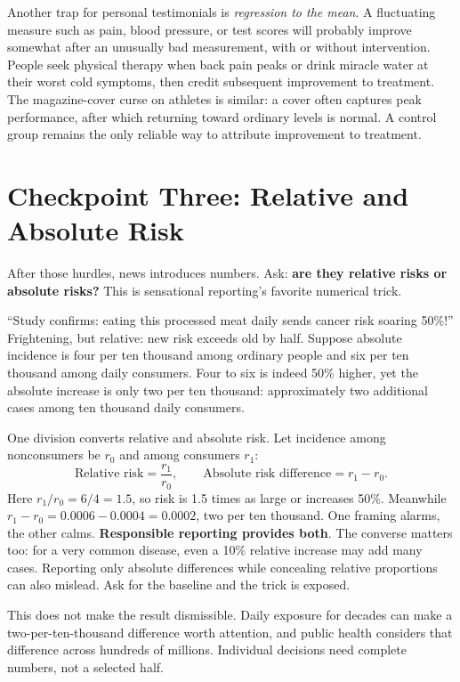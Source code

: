 Another trap for personal testimonials is \emph{regression to the mean}. A fluctuating measure such as pain, blood pressure, or test scores will probably improve somewhat after an unusually bad measurement, with or without intervention. People seek physical therapy when back pain peaks or drink miracle water at their worst cold symptoms, then credit subsequent improvement to treatment. The magazine-cover curse on athletes is similar: a cover often captures peak performance, after which returning toward ordinary levels is normal. A control group remains the only reliable way to attribute improvement to treatment.

\section{Checkpoint Three: Relative and Absolute Risk}

After those hurdles, news introduces numbers. Ask: \textbf{are they relative risks or absolute risks?} This is sensational reporting's favorite numerical trick.

``Study confirms: eating this processed meat daily sends cancer risk soaring 50\%!'' Frightening, but relative: new risk exceeds old by half. Suppose absolute incidence is four per ten thousand among ordinary people and six per ten thousand among daily consumers. Four to six is indeed 50\% higher, yet the absolute increase is only two per ten thousand: approximately two additional cases among ten thousand daily consumers.

\begin{qiaoliang}
One division converts relative and absolute risk. Let incidence among nonconsumers be $r_0$ and among consumers $r_1$:
\[
\text{Relative risk} = \frac{r_1}{r_0}, \qquad \text{Absolute risk difference} = r_1 - r_0 .
\]
Here $r_1/r_0 = 6/4 = 1.5$, so risk is 1.5 times as large or increases 50\%. Meanwhile $r_1 - r_0 = 0.0006 - 0.0004 = 0.0002$, two per ten thousand. One framing alarms, the other calms. \textbf{Responsible reporting provides both}. The converse matters too: for a very common disease, even a 10\% relative increase may add many cases. Reporting only absolute differences while concealing relative proportions can also mislead. Ask for the baseline and the trick is exposed.
\end{qiaoliang}

This does not make the result dismissible. Daily exposure for decades can make a two-per-ten-thousand difference worth attention, and public health considers that difference across hundreds of millions. Individual decisions need complete numbers, not a selected half.

